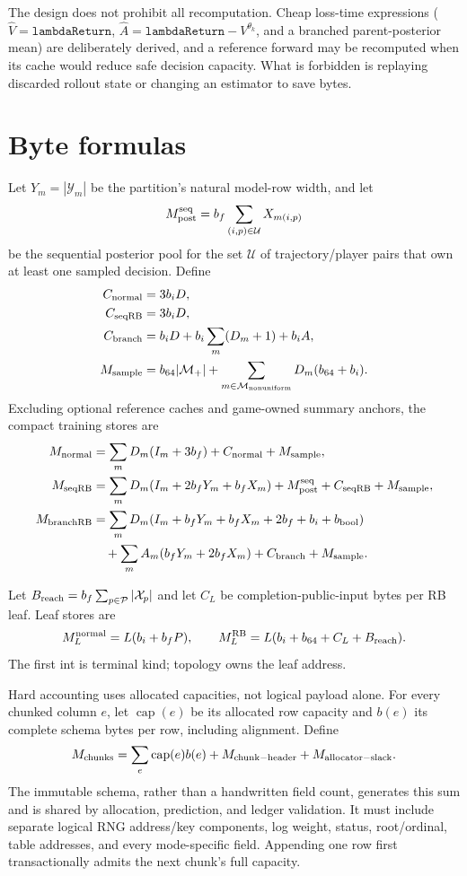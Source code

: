 \documentclass[10pt,a4paper]{article}
\begin{document}
The design does not prohibit all recomputation.  Cheap loss-time expressions
($\widehat V=\mathtt{lambdaReturn}$,
$\widehat A=\mathtt{lambdaReturn}-V^{\theta_k}$, and a branched
parent-posterior mean) are deliberately derived, and a reference forward may be
recomputed when its cache would reduce safe decision capacity.  What is
forbidden is replaying discarded rollout state or changing an estimator to
save bytes.

\section{Byte formulas}

Let $Y_m=|\mathcal Y_m|$ be the partition's natural model-row width, and let
\[
 M_{\rm post}^{\rm seq}=b_f\sum_{(i,p)\in\mathcal U}X_{m(i,p)}
\]
be the sequential posterior pool for the set $\mathcal U$ of trajectory/player
pairs that own at least one sampled decision.  Define
\begin{align*}
 C_{\rm normal}&=3b_iD,\\
 C_{\rm seqRB}&=3b_iD,\\
 C_{\rm branch}&=b_iD+b_i\sum_m(D_m+1)+b_iA,\\
 M_{\rm sample}&=b_{64}|\mathcal M_+|+
   \sum_{m\in\mathcal M_{\rm nonuniform}}D_m(b_{64}+b_i).
\end{align*}
Excluding optional reference caches and game-owned summary anchors, the compact
training stores are
\begin{align*}
 M_{\rm normal}
  &=\sum_mD_m(I_m+3b_f)+C_{\rm normal}+M_{\rm sample},\\
 M_{\rm seqRB}
  &=\sum_mD_m(I_m+2b_fY_m+b_fX_m)
    +M_{\rm post}^{\rm seq}+C_{\rm seqRB}+M_{\rm sample},\\
M_{\rm branchRB}
  &=\sum_mD_m(I_m+b_fY_m+b_fX_m+2b_f+b_i+b_{\rm bool})\\
  &\quad+\sum_mA_m(b_fY_m+2b_fX_m)
    +C_{\rm branch}+M_{\rm sample}.
\end{align*}

Let $B_{\rm reach}=b_f\sum_{p\in\mathcal P}|\mathcal X_p|$ and let $C_L$
be completion-public-input bytes per RB leaf.  Leaf stores are
\[
 M_L^{\rm normal}=L(b_i+b_fP),\qquad
 M_L^{\rm RB}=L(b_i+b_{64}+C_L+B_{\rm reach}).
\]
The first int is terminal kind; topology owns the leaf address.

Hard accounting uses allocated capacities, not logical payload alone.  For
every chunked column $e$, let $\operatorname{cap}(e)$ be its allocated row
capacity and $b(e)$ its complete schema bytes per row, including alignment.
Define
\[
 M_{\rm chunks}=\sum_e\operatorname{cap}(e)b(e)
   +M_{\rm chunk-header}+M_{\rm allocator-slack}.
\]
The immutable schema, rather than a handwritten field count, generates this
sum and is shared by allocation, prediction, and ledger validation.  It must
include separate logical RNG address/key components, log weight, status,
root/ordinal, table addresses, and every mode-specific field.  Appending one
row first transactionally admits the next chunk's full capacity.
\end{document}
